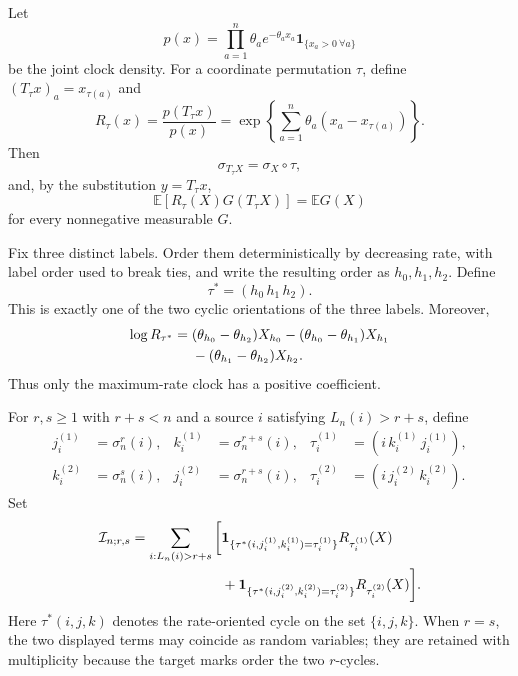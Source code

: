 \documentclass[11pt]{article}
\theoremstyle{remark}
\newcommand{\Ee}{\mathbb E}
\newcommand{\one}{\mathbf 1}
\begin{document}
Let
\[
 p(x)=\prod_{a=1}^n\theta_a e^{-\theta_ax_a}
 \one_{\{x_a>0\ \forall a\}}
\]
be the joint clock density.  For a coordinate permutation $\tau$, define
$(T_\tau x)_a=x_{\tau(a)}$ and
\begin{equation}\label{eq:Rtau}
 R_\tau(x)=\frac{p(T_\tau x)}{p(x)}
 =\exp\left\{\sum_{a=1}^n\theta_a(x_a-x_{\tau(a)})\right\}.
\end{equation}
Then
\begin{equation}\label{eq:tau-rank}
 \sigma_{T_\tau X}=\sigma_X\circ\tau,
\end{equation}
and, by the substitution $y=T_\tau x$,
\begin{equation}\label{eq:tau-cov}
 \Ee[R_\tau(X)G(T_\tau X)]=\Ee G(X)
\end{equation}
for every nonnegative measurable $G$.

Fix three distinct labels.  Order them deterministically by decreasing rate,
with label order used to break ties, and write the resulting order as
$h_0,h_1,h_2$.  Define
\[
 \tau^*=(h_0\,h_1\,h_2).
\]
This is exactly one of the two cyclic orientations of the three labels.
Moreover,
\begin{align}
 \log R_{\tau^*}
 ={}&(\theta_{h_0}-\theta_{h_2})X_{h_0}
 -(\theta_{h_0}-\theta_{h_1})X_{h_1}
 \notag\\
 &-(\theta_{h_1}-\theta_{h_2})X_{h_2}.
 \label{eq:one-positive}
\end{align}
Thus only the maximum-rate clock has a positive coefficient.

For $r,s\geq1$ with $r+s<n$ and a source $i$ satisfying
$L_n(i)>r+s$, define
\begin{align*}
 j_i^{(1)}&=\sigma_n^r(i),&
 k_i^{(1)}&=\sigma_n^{r+s}(i),&
 \tau_i^{(1)}&=(i\,k_i^{(1)}\,j_i^{(1)}),\\
 k_i^{(2)}&=\sigma_n^s(i),&
 j_i^{(2)}&=\sigma_n^{r+s}(i),&
 \tau_i^{(2)}&=(i\,j_i^{(2)}\,k_i^{(2)}).
\end{align*}
Set
\begin{align}
 \mathcal I_{n;r,s}
 =\sum_{i:L_n(i)>r+s}\bigg[&
 \one_{\{\tau^*(i,j_i^{(1)},k_i^{(1)})=\tau_i^{(1)}\}}
 R_{\tau_i^{(1)}}(X)
 \notag\\
 &+\one_{\{\tau^*(i,j_i^{(2)},k_i^{(2)})=\tau_i^{(2)}\}}
 R_{\tau_i^{(2)}}(X)
 \bigg].
 \label{eq:I-explicit}
\end{align}
Here $\tau^*(i,j,k)$ denotes the rate-oriented cycle on the set
$\{i,j,k\}$.  When $r=s$, the two displayed terms may coincide as random
variables; they are retained with multiplicity because the target marks
order the two $r$-cycles.
\end{document}

